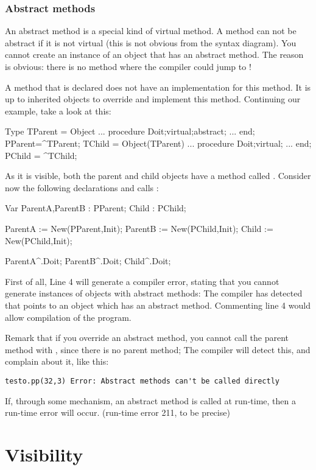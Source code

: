 \documentclass{report}
\begin{document}
\subsubsection{Abstract methods}

An abstract method is a special kind of virtual method. A method can not be
abstract if it is not virtual (this is not obvious from the syntax diagram). 
You cannot create an instance of an object that has an abstract method. 
The reason is obvious: there is no method where the compiler could jump to !

A method that is declared  does not have an implementation for
this method. It is up to inherited objects to override and implement this 
method. Continuing our example, take a look at this:
\begin{listing}
Type
  TParent = Object 
    ...
    procedure Doit;virtual;abstract;
    ...
    end;
  PParent=^TParent;
  TChild = Object(TParent) 
    ...
    procedure Doit;virtual;
    ...
    end;
  PChild = ^TChild;  
\end{listing}
As it is visible, both the parent and child objects have a method called
. Consider now the following declarations and calls :
\begin{listing}
Var ParentA,ParentB : PParent;
    Child           : PChild;

   ParentA := New(PParent,Init);
   ParentB := New(PChild,Init);
   Child := New(PChild,Init);

   ParentA^.Doit;
   ParentB^.Doit;
   Child^.Doit;
\end{listing}
First of all, Line 4 will generate a compiler error, stating that you cannot
generate instances of objects with abstract methods: The compiler has
detected that  points to an object which has an abstract
method. Commenting line 4 would allow compilation of the program.

Remark that if you override an abstract method, you cannot call the parent
method with , since there is no parent method; The compiler
will detect this, and complain about it, like this:
\begin{verbatim}
testo.pp(32,3) Error: Abstract methods can't be called directly
\end{verbatim}

If, through some mechanism, an abstract method is called at run-time,
then a run-time error will occur. (run-time error 211, to be precise)

\section{Visibility}
\end{document}
